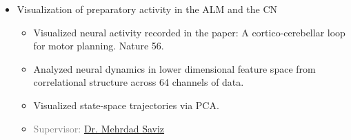 \documentclass[10pt,a4paper,sans]{moderncv} %
\begin{document}
\begin{itemize}
        \item Visualization of preparatory activity in the ALM and the CN
		\begin{itemize}
			\item Visualized neural activity recorded in the paper: A cortico-cerebellar loop for motor planning. Nature 56.
            \item Analyzed neural dynamics in lower dimensional feature space from correlational structure across 64 channels of data.
            \item Visualized state-space trajectories via PCA.
			\item \textcolor{gray}{Supervisor: \href{https://ieeexplore.ieee.org/author/38272636800}{Dr. Mehrdad Saviz}}
		\end{itemize}
		
%			
%		
%		
%		
	\end{itemize}
	
\end{document}

